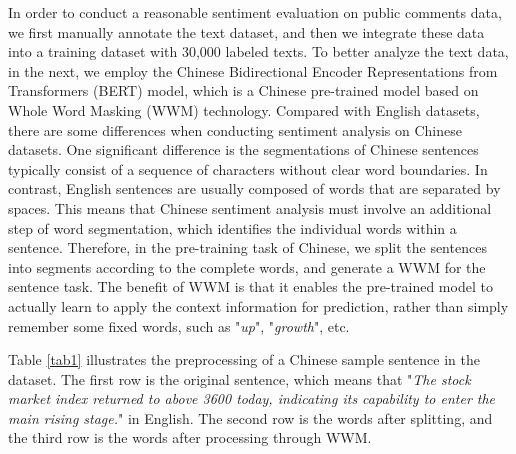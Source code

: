 \documentclass[sn-mathphys]{sn-jnl}%
\theoremstyle{thmstyleone}%
\theoremstyle{thmstyletwo}%
\theoremstyle{thmstylethree}%
\begin{document}
In order to conduct a reasonable sentiment evaluation on public comments data, we first manually annotate the text dataset, and then we integrate these data into a training dataset with 30,000 labeled texts. To better analyze the text data, in the next, we employ the Chinese Bidirectional Encoder Representations from Transformers (BERT) model\cite{RN167}, which is a Chinese pre-trained model based on Whole Word Masking (WWM) technology. Compared with English datasets, there are some differences when conducting sentiment analysis on Chinese datasets. One significant difference is the segmentations of Chinese sentences typically consist of a sequence of characters without clear word boundaries. In contrast, English sentences are usually composed of words that are separated by spaces. This means that Chinese sentiment analysis must involve an additional step of word segmentation, which identifies the individual words within a sentence. Therefore, in the pre-training task of Chinese, we split the sentences into segments according to the complete words, and generate a WWM for the sentence task. The benefit of WWM is that it enables the pre-trained model to actually learn to apply the context information for prediction, rather than simply remember some fixed words, such as "\emph{up}", "\emph{growth}", etc.

Table \ref{tab1} illustrates the preprocessing of a Chinese sample sentence in the dataset. The first row is the original sentence, which means that "{\it The stock market index returned to above 3600 today, indicating its capability to enter the main rising stage.}" in English. The second row is the words after splitting, and the third row is the words after processing through WWM.
\end{document}
